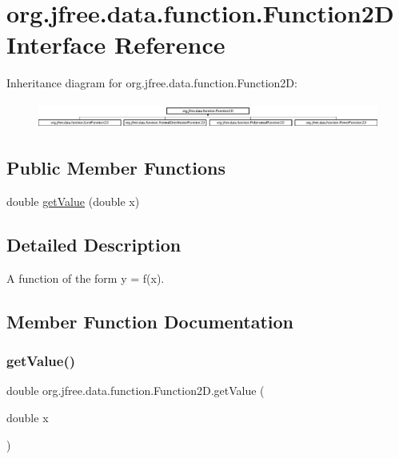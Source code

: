 \hypertarget{interfaceorg_1_1jfree_1_1data_1_1function_1_1_function2_d}{}\section{org.\+jfree.\+data.\+function.\+Function2D Interface Reference}
\label{interfaceorg_1_1jfree_1_1data_1_1function_1_1_function2_d}
Inheritance diagram for org.\+jfree.\+data.\+function.\+Function2D\+:\begin{figure}[H]
\begin{center}
\leavevmode
\includegraphics[height=0.880503cm]{interfaceorg_1_1jfree_1_1data_1_1function_1_1_function2_d}
\end{center}
\end{figure}
\subsection*{Public Member Functions}
\begin{DoxyCompactItemize}
\item 
double \mbox{\hyperlink{interfaceorg_1_1jfree_1_1data_1_1function_1_1_function2_d_a0f925a1dfe40f894d7f763f39320db22}{get\+Value}} (double x)
\end{DoxyCompactItemize}


\subsection{Detailed Description}
A function of the form {\ttfamily y = f(x)}. 

\subsection{Member Function Documentation}
\mbox{\label{interfaceorg_1_1jfree_1_1data_1_1function_1_1_function2_d_a0f925a1dfe40f894d7f763f39320db22}} 
\subsubsection{\texorpdfstring{get\+Value()}{getValue()}}
{\footnotesize\ttfamily double org.\+jfree.\+data.\+function.\+Function2\+D.\+get\+Value (\begin{DoxyParamCaption}\item[{double}]{x }\end{DoxyParamCaption})}

